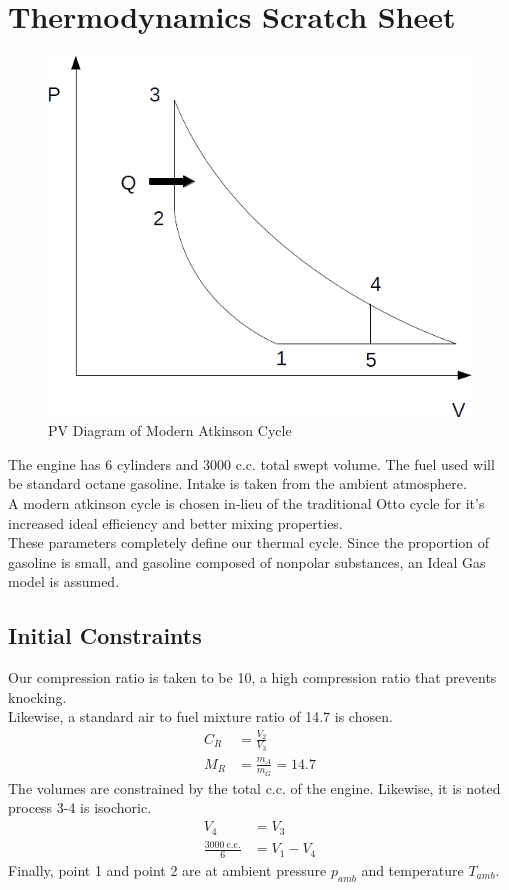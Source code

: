 \documentclass[10pt,a4paper]{article}
\begin{document}
\section*{Thermodynamics Scratch Sheet}


	\begin{figure}[h]
		\centering
		\includegraphics[width=.5\textwidth]{ThermoDiagram.png}
		\caption{PV Diagram of Modern Atkinson Cycle}
		\label{fig:diagram1}
	\end{figure}
	The engine has 6 cylinders and 3000 c.c. total swept volume. The fuel used will be standard octane gasoline. Intake is taken from the ambient atmosphere.\\
	A modern atkinson cycle is chosen in-lieu of the traditional Otto cycle for it's increased ideal efficiency and better mixing properties.\\
	These parameters completely define our thermal cycle. Since the proportion of gasoline is small, and gasoline composed of nonpolar substances, an Ideal Gas model is assumed.
	\subsection*{Initial Constraints}
	Our compression ratio is taken to be 10, a high compression ratio that prevents knocking. \\
	Likewise, a standard air to fuel mixture ratio of 14.7 is chosen.
	\begin{align}
		C_R &= \frac{V_2}{V_3} \\
		M_R &= \frac{m_A}{m_G} = 14.7
	\end{align}
	The volumes are constrained by the total c.c. of the engine. Likewise, it is noted process 3-4 is isochoric.
	\begin{align}
		V_4 &= V_3\\
		\frac{3000\ \text{c.c.}}{6} &= V_1-V_4 
	\end{align}
	Finally, point 1 and point 2 are at ambient pressure $p_{amb}$ and temperature $T_{amb}$.
\end{document}
